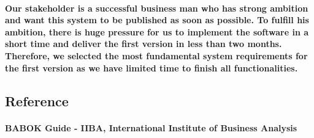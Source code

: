 \documentclass[12pt]{amsart}
\begin{document}
\paragraph{Our stakeholder is a successful business man who has strong ambition and want this system to be published as soon as possible. To fulfill his ambition, there is huge pressure for us to implement the software in a short time and deliver the first version in less than two months. Therefore, we selected the most fundamental system requirements for the first version as we have limited time to finish all functionalities.}



\subsection{\textbf{Reference}}
\paragraph{BABOK Guide - IIBA, International Institute of Business Analysis}
\end{document}
